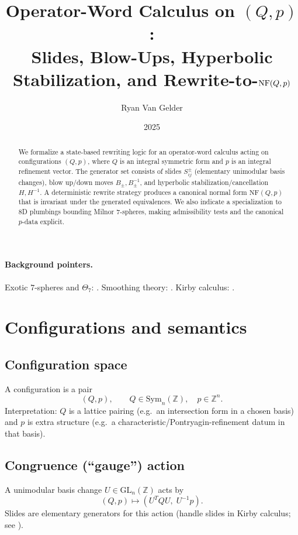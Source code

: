 \documentclass[11pt]{article}
\title{Operator-Word Calculus on \texorpdfstring{$(Q,p)$}{(Q,p)}:\\
Slides, Blow-Ups, Hyperbolic Stabilization, and Rewrite-to-\texorpdfstring{$\NF(Q,p)$}{NF(Q,p)}}
\author{Ryan Van Gelder}
\date{2025}
\newcommand{\ZZ}{\mathbb{Z}}
\newcommand{\Sym}{\mathrm{Sym}}
\newcommand{\NF}{\mathrm{NF}}
\newcommand{\GL}{\mathrm{GL}}
\begin{document}
\maketitle

\begin{abstract}
We formalize a state-based rewriting logic for an operator-word calculus acting on configurations
$(Q,p)$, where $Q$ is an integral symmetric form and $p$ is an integral refinement vector.
The generator set consists of slides $S_{ij}^{\pm}$ (elementary unimodular basis changes),
blow up/down moves $B_{\pm}, B_{\pm}^{-1}$, and hyperbolic stabilization/cancellation $H,H^{-1}$.
A deterministic rewrite strategy produces a canonical normal form $\NF(Q,p)$ that is invariant
under the generated equivalences. We also indicate a specialization to 8D plumbings bounding Milnor
7-spheres, making admissibility tests and the canonical $p$-data explicit.
\end{abstract}

\paragraph{Background pointers.}
Exotic $7$-spheres and $\Theta_7$: \cite{Mil56,KM63}. Smoothing theory: \cite{KS77}. Kirby calculus:
\cite{Kir78,GS99}.

\section{Configurations and semantics}

\subsection{Configuration space}
A configuration is a pair
\[
(Q,p),\qquad Q\in \Sym_n(\ZZ),\quad p\in \ZZ^n.
\]
Interpretation: $Q$ is a lattice pairing (e.g.\ an intersection form in a chosen basis) and $p$ is
extra structure (e.g.\ a characteristic/Pontryagin-refinement datum in that basis).

\subsection{Congruence (``gauge'') action}
A unimodular basis change $U\in \GL_n(\ZZ)$ acts by
\[
(Q,p)\longmapsto (U^T Q U,\; U^{-1}p).
\]
Slides are elementary generators for this action (handle slides in Kirby calculus; see \cite{Kir78,GS99}).
\end{document}
